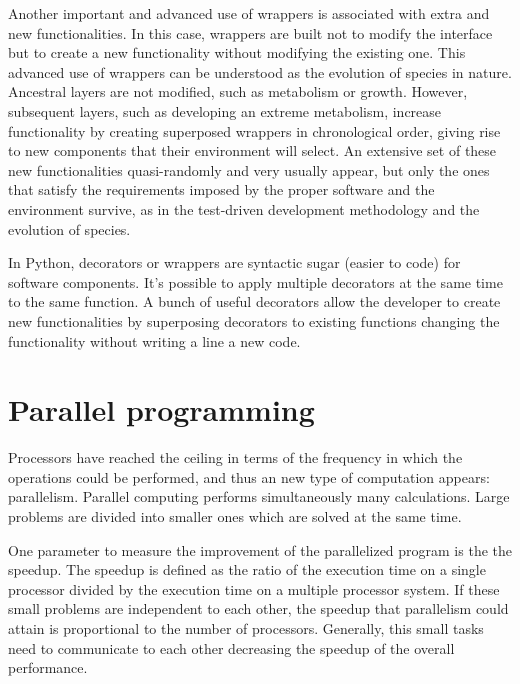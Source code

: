 Another important and advanced use of wrappers is associated with extra and new functionalities. 
In this case, wrappers are built not to 
modify the interface  but to create a new functionality without modifying the existing one. This advanced 
use of wrappers can be understood as the evolution of species in nature. 
Ancestral layers are not modified, such as metabolism or growth. However, subsequent layers, 
such as developing an extreme metabolism,  increase functionality by creating superposed 
wrappers in chronological order, giving rise to new components that their 
environment will select. 
An extensive set of these new functionalities quasi-randomly and very usually appear, 
but only the ones that satisfy 
the requirements imposed by the proper software and the environment survive, 
as in the test-driven development methodology and the evolution of 
species.





In Python, decorators or wrappers are syntactic sugar (easier to code) for software components. 
It's possible to apply multiple decorators at the same time to the same function. 
A bunch of useful decorators allow the developer to create new functionalities by superposing 
decorators to existing functions changing the functionality 
without writing a line a new code. 






\newpage 
    \section{Parallel programming} 
Processors have reached the ceiling in terms of the frequency in which the operations 
could be performed, and thus an new type of computation appears: parallelism.  
Parallel computing performs simultaneously many calculations. 
Large problems are divided into smaller ones which are solved at the same time.

One parameter to measure the improvement of the parallelized program is the the speedup. 
The speedup is defined as the ratio of the execution time on a single processor divided by 
the execution time on a multiple processor system. 
If these small problems are independent to each other, the speedup that parallelism could attain 
is proportional to the number of processors. 
Generally, this small tasks need to communicate to each other decreasing the speedup of the 
overall performance. 

